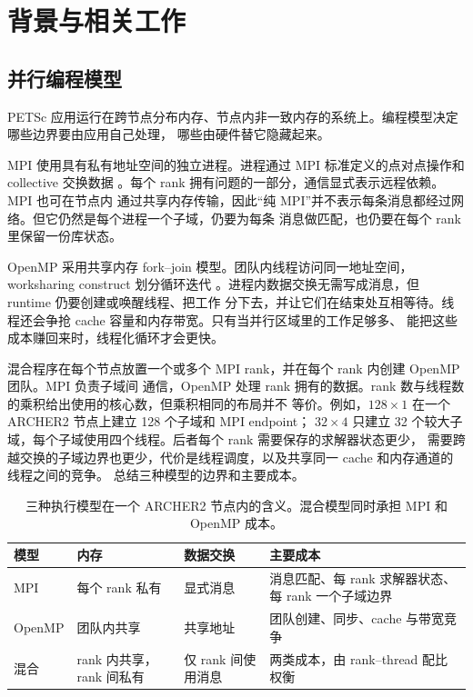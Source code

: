 \documentclass[11pt,a4paper,oneside]{report}
\begin{document}
\chapter{背景与相关工作}
\label{ch:background}

\section{并行编程模型}
\label{sec:models}
PETSc 应用运行在跨节点分布内存、节点内非一致内存的系统上。编程模型决定哪些边界要由应用自己处理，
哪些由硬件替它隐藏起来。

MPI 使用具有私有地址空间的独立进程。进程通过 MPI 标准定义的点对点操作和 collective
交换数据 \cite{mpi41}。每个 rank 拥有问题的一部分，通信显式表示远程依赖。MPI 也可在节点内
通过共享内存传输，因此“纯 MPI”并不表示每条消息都经过网络。但它仍然是每个进程一个子域，仍要为每条
消息做匹配，也仍要在每个 rank 里保留一份库状态。

OpenMP 采用共享内存 fork--join 模型。团队内线程访问同一地址空间，worksharing construct
划分循环迭代 \cite{openmp52}。进程内数据交换无需写成消息，但 runtime 仍要创建或唤醒线程、把工作
分下去，并让它们在结束处互相等待。线程还会争抢 cache 容量和内存带宽。只有当并行区域里的工作足够多、
能把这些成本赚回来时，线程化循环才会更快。

混合程序在每个节点放置一个或多个 MPI rank，并在每个 rank 内创建 OpenMP 团队。MPI 负责子域间
通信，OpenMP 处理 rank 拥有的数据。rank 数与线程数的乘积给出使用的核心数，但乘积相同的布局并不
等价。例如，$128\times1$ 在一个 ARCHER2 节点上建立 128 个子域和 MPI endpoint；
$32\times4$ 只建立 32 个较大子域，每个子域使用四个线程。后者每个 rank 需要保存的求解器状态更少，
需要跨越交换的子域边界也更少，代价是线程调度，以及共享同一 cache 和内存通道的线程之间的竞争。 总结三种模型的边界和主要成本。

\begin{table}[htbp]
  \centering
  \caption{三种执行模型在一个 ARCHER2 节点内的含义。混合模型同时承担 MPI 和 OpenMP 成本。}
  \label{tab:models}
  \begin{tabular}{l p{} p{} p{}}
    \toprule
    模型 & 内存 & 数据交换 & 主要成本 \\
    \midrule
    MPI    & 每个 rank 私有
           & 显式消息
           & 消息匹配、每 rank 求解器状态、每 rank 一个子域边界 \\
    \addlinespace
    OpenMP & 团队内共享
           & 共享地址
           & 团队创建、同步、cache 与带宽竞争 \\
    \addlinespace
    混合 & rank 内共享，rank 间私有
           & 仅 rank 间使用消息
           & 两类成本，由 rank--thread 配比权衡 \\
    \bottomrule
  \end{tabular}
\end{table}
\end{document}
